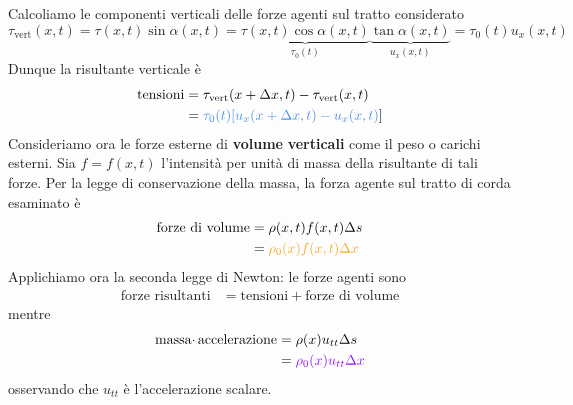 Calcoliamo le componenti verticali delle forze agenti sul tratto considerato
\begin{equation*}
    \tau _{\text{vert}}(x,t) =\tau (x,t)\sin \alpha (x,t) =\underbrace{\tau (x,t)\cos \alpha (x,t)}_{\tau _{0}(t)}\underbrace{\tan \alpha (x,t)}_{u_{x}(x,t)} =\tau _{0}(t) u_{x}(x,t)
\end{equation*}
Dunque la risultante verticale è
\begin{align*}
    \text{tensioni} & =\tau _{\text{vert}}(x+\Delta x,t) -\tau _{\text{vert}}(x,t)                     \\
                    & =\textcolor[rgb]{0.29,0.56,0.89}{\tau _{0}(t)[ u_{x}(x+\Delta x,t) -u_{x}(x,t)}]
\end{align*}
Consideriamo ora le forze esterne di \textbf{volume} \textbf{verticali} come il peso o carichi esterni. Sia $\displaystyle f=f(x,t)$ l'intensità per unità di massa della risultante di tali forze. Per la legge di conservazione della massa, la forza agente sul tratto di corda esaminato è
\begin{align*}
    \text{forze di volume} & =\rho (x,t) f(x,t) \Delta s                                    \\
                           & =\textcolor[rgb]{0.96,0.65,0.14}{\rho _{0}(x) f(x,t) \Delta x}
\end{align*}
Applichiamo ora la seconda legge di Newton: le forze agenti sono
\begin{align*}
    \text{forze risultanti} & =\text{tensioni} +\text{forze di volume}
\end{align*}
mentre
\begin{align*}
    \text{massa} \cdotp \text{accelerazione} & =\rho (x) u_{tt} \Delta s                                   \\
                                             & =\textcolor[rgb]{0.56,0.07,1}{\rho _{0}(x) u_{tt} \Delta x}
\end{align*}
osservando che $\displaystyle u_{tt}$ è l'accelerazione scalare.


